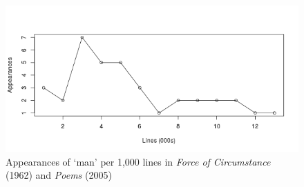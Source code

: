 \documentclass[]{article}
\begin{document}
\begin{figure}[htbp]
\centering
\includegraphics{figs/man.png}
\caption{Appearances of ‘man’ per 1,000 lines in \emph{Force of
Circumstance} (1962) and \emph{Poems} (2005)\label{fig:man}}
\end{figure}
\end{document}
